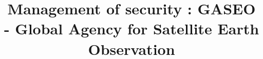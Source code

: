 \documentclass[12pt]{article}
\begin{document}
\title{Management of security : GASEO -  Global Agency for Satellite Earth Observation}
\submitdate{\today}
\maketitle

\addtocounter{page}{-1}
\thispagestyle{empty}



\newpage
\doublespacing
\tableofcontents
\singlespacing






\end{document}
